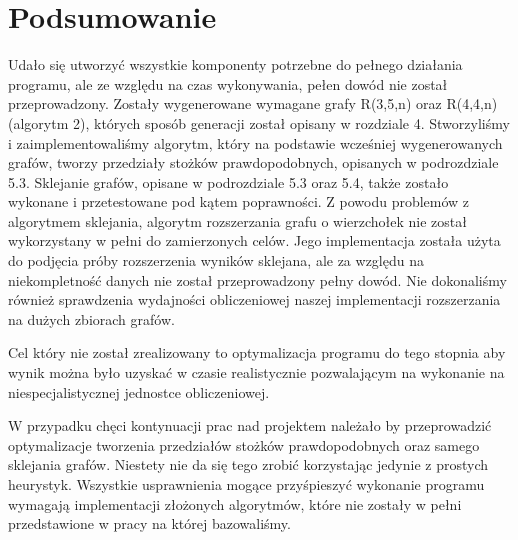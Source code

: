 \chapter{Podsumowanie}
Udało się utworzyć wszystkie komponenty potrzebne do pełnego działania programu, ale ze względu na czas wykonywania, pełen dowód nie został przeprowadzony. Zostały wygenerowane wymagane grafy R(3,5,n) oraz R(4,4,n) (algorytm 2), których sposób generacji został opisany w rozdziale 4. Stworzyliśmy i zaimplementowaliśmy algorytm, który na podstawie wcześniej wygenerowanych grafów, tworzy przedziały stożków prawdopodobnych, opisanych w podrozdziale 5.3. Sklejanie grafów, opisane w podrozdziale 5.3 oraz 5.4, także zostało wykonane i przetestowane pod kątem poprawności. Z powodu problemów z algorytmem sklejania, algorytm rozszerzania grafu o wierzchołek nie został wykorzystany w pełni do zamierzonych celów. Jego implementacja została użyta do podjęcia próby rozszerzenia wyników sklejana, ale za względu na niekompletność danych nie został przeprowadzony pełny dowód. Nie dokonaliśmy również sprawdzenia wydajności obliczeniowej naszej implementacji rozszerzania na dużych zbiorach grafów.

Cel który nie został zrealizowany to optymalizacja programu do tego stopnia aby wynik można było uzyskać w czasie realistycznie pozwalającym na wykonanie na niespecjalistycznej jednostce obliczeniowej. 

W przypadku chęci kontynuacji prac nad projektem należało by przeprowadzić optymalizacje tworzenia przedziałów stożków prawdopodobnych oraz samego sklejania grafów. Niestety nie da się tego zrobić korzystając jedynie z prostych heurystyk. Wszystkie usprawnienia mogące przyśpieszyć wykonanie programu wymagają implementacji złożonych algorytmów, które nie zostały w pełni przedstawione w pracy na której bazowaliśmy. 